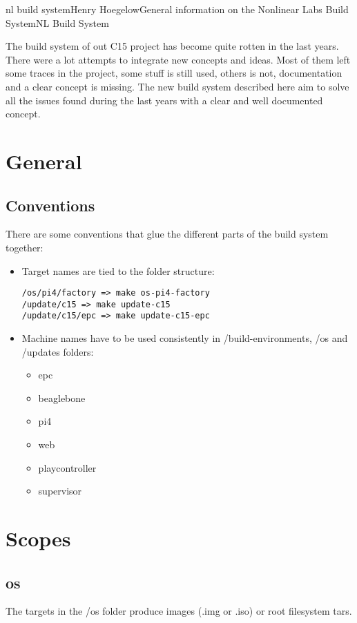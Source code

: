\documentclass[11pt]{article}
\begin{document}
\begin{Name}{1}{nl build system}{Henry Hoegelow}{General information on the Nonlinear Labs Build System}{NL Build System}

The build system of out C15 project has become quite rotten in the last years. There were a lot attempts to integrate new concepts and ideas. Most of them left some traces in the project, some stuff is still used, others is not, documentation and a clear concept is missing. The new build system described here aim to solve all the issues found during the last years with a clear and well documented concept.

\section{General}

\subsection{Conventions}
There are some conventions that glue the different parts of the build system together:
\begin{itemize}
\item Target names are tied to the folder structure: 
\begin{verbatim}
/os/pi4/factory => make os-pi4-factory
/update/c15 => make update-c15
/update/c15/epc => make update-c15-epc
\end{verbatim}
\item Machine names have to be used consistently in /build-environments, /os and /updates folders:
\begin{itemize} \label{machine}
\item epc
\item beaglebone
\item pi4
\item web
\item playcontroller
\item supervisor
\end{itemize}
\end{itemize}

\section{Scopes}

\subsection{os}
The targets in the /os folder produce images (.img or .iso) or root filesystem tars. 


\end{Name}
\end{document}
